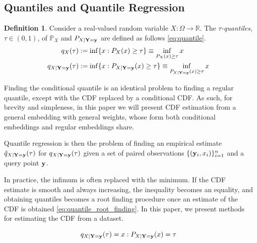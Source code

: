 \documentclass[twoside]{article} \usepackage{aistats2017}
\theoremstyle{definition}
\newtheorem{definition}{Definition}[section]
\theoremstyle{theorem}
\newcommand{\rv}[1]{{#1}}
\begin{document}
	\subsection{Quantiles and Quantile Regression}
	\label{sec:background:quantiles}

		\begin{definition} \label{def:quantile}
			\citep{takeuchi2006nonparametric}
			Consider a real-valued random variable $\rv{X} : \Omega \to \mathbb{R}$. The \textit{$\tau$-quantiles}, $\tau \in (0, 1)$, of $\mathbb{P}_{\rv{X}}$ and $P_{\rv{X} | \bvec{\rv{Y}} = \bvec{y}}$ are defined as follows \eqref{eq:quantile}.
			\begin{equation}
				\begin{aligned}
					q_{\rv{X}}(\tau) &:= \inf\{x : P_{\rv{X}}(x) \geq \tau\} \equiv \inf_{P_{\rv{X}}(x) \geq \tau} x \\
					q_{\rv{X} | \bvec{\rv{Y}} = \bvec{y}}(\tau) &:= \inf\{x : P_{\rv{X} | \bvec{\rv{Y}} = \bvec{y}}(x) \geq \tau\} \equiv \inf_{P_{\rv{X} | \bvec{\rv{Y}} = \bvec{y}}(x) \geq \tau} x
				\end{aligned}
			\label{eq:quantile}
			\end{equation}
		\end{definition}

		Finding the conditional quantile is an identical problem to finding a regular quantile, except with the CDF replaced by a conditional CDF. As such, for brevity and simpleness, in this paper we will present CDF estimation from a general embedding with general weights, whose form both conditional embeddings and regular embeddings share.

		Quantile regression is then the problem of finding an empirical estimate $\hat{q}_{\rv{X} | \bvec{\rv{Y}} = \bvec{y}}(\tau)$ for $q_{\rv{X} | \bvec{\rv{Y}} = \bvec{y}}(\tau)$ given a set of paired observations $\{(\mathbf{y}_{i}, x_{i})\}_{i = 1}^{n}$ and a query point $\mathbf{y}$.
		
		In practice, the infimum is often replaced with the minimum. If the CDF estimate is smooth and always increasing, the inequality becomes an equality, and obtaining quantiles becomes a root finding procedure once an estimate of the CDF is obtained \eqref{eq:quantile_root_finding}. In this paper, we present methods for estimating the CDF from a dataset.
		
		\begin{equation}
			q_{\rv{X} | \bvec{\rv{Y}} = \bvec{y}}(\tau) = x : P_{\rv{X} | \bvec{\rv{Y}} = \bvec{y}}(x) = \tau
		\label{eq:quantile_root_finding}
		\end{equation}	
	
\end{document}
